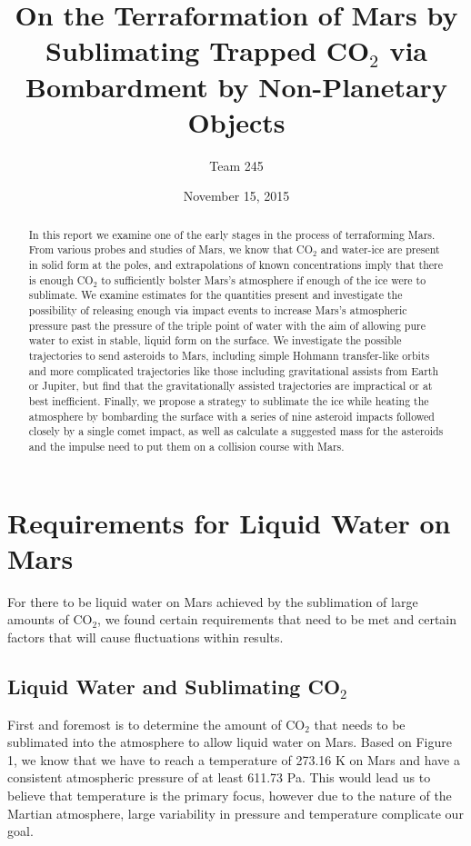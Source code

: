 \documentclass[a4paper]{article}
\title{On the Terraformation of Mars by Sublimating Trapped CO$_2$ via Bombardment by Non-Planetary Objects}
\author{Team 245}
\date{November 15, 2015}
\begin{document}
  \maketitle

  \begin{abstract}
  In this report we examine one of the early stages in the process of terraforming Mars. From various probes and studies of Mars, we know that CO$_2$ and water-ice are present in solid form at the poles, and extrapolations of known concentrations imply that there is enough CO$_2$ to sufficiently bolster Mars's atmosphere if enough of the ice were to sublimate. We examine estimates for the quantities present and investigate the possibility of releasing enough via impact events to increase Mars's atmospheric pressure past the pressure of the triple point of water with the aim of allowing pure water to exist in stable, liquid form on the surface. We investigate the possible trajectories to send asteroids to Mars, including simple Hohmann transfer-like orbits and more complicated trajectories like those including gravitational assists from Earth or Jupiter, but find that the gravitationally assisted trajectories are impractical or at best inefficient. Finally, we propose a strategy to sublimate the ice while heating the atmosphere by bombarding the surface with a series of nine asteroid impacts followed closely by a single comet impact, as well as calculate a suggested mass for the asteroids and the impulse need to put them on a collision course with Mars.
  \end{abstract}

  \clearpage
  \tableofcontents
  \clearpage
  
  \section{Requirements for Liquid Water on Mars}

	For there to be liquid water on Mars achieved by the sublimation of large amounts of CO$_2$, we found certain requirements that need to be met and certain factors that will cause fluctuations within results.

  \subsection{Liquid Water and Sublimating CO$_2$}
  
  First and foremost is to determine the amount of CO$_2$ that needs to be sublimated into the atmosphere to allow liquid water on Mars. Based on Figure 1, we know that we have to reach a temperature of 273.16 K on Mars and have a consistent atmospheric pressure of at least 611.73 Pa. This would lead us to believe that temperature is the primary focus, however due to the nature of the Martian atmosphere, large variability in pressure and temperature complicate our goal.
  
\end{document}

